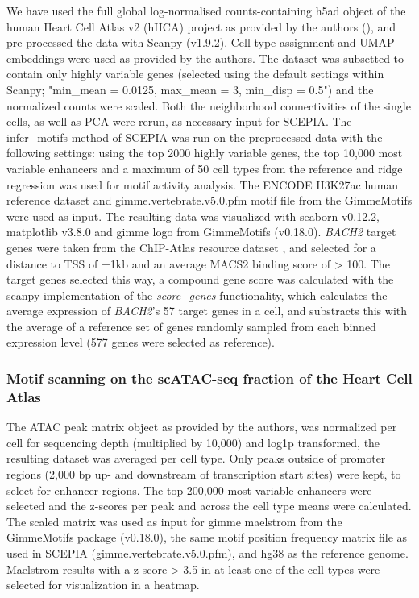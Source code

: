 We have used the full global log-normalised counts-containing h5ad object of the human Heart Cell Atlas v2 (hHCA) project as provided by the authors (\cite{Kanemaru2023}), and pre-processed the data with Scanpy (v1.9.2). Cell type assignment and UMAP-embeddings were used as provided by the authors. The dataset was subsetted to contain only highly variable genes (selected using the default settings within Scanpy; "min\_mean = 0.0125, max\_mean = 3, min\_disp = 0.5") and the normalized counts were scaled. Both the neighborhood connectivities of the single cells, as well as PCA were rerun, as necessary input for SCEPIA. The infer\_motifs method of SCEPIA was run on the preprocessed data with the following settings: using the top 2000 highly variable genes, the top 10,000 most variable enhancers and a maximum of 50 cell types from the reference and ridge regression was used for motif activity analysis. The ENCODE H3K27ac human reference dataset and gimme.vertebrate.v5.0.pfm motif file from the GimmeMotifs were used as input. The resulting data was visualized with seaborn v0.12.2, matplotlib v3.8.0 and gimme logo from GimmeMotifs (v0.18.0). \textit{BACH2} target genes were taken from the ChIP-Atlas resource dataset \cite{Oki2018,Zou2022,BACH2_target_genes}, and selected for a distance to TSS of ±1kb and an average MACS2 binding score of > 100. The target genes selected this way, a compound gene score was calculated with the scanpy implementation of the \textit{score\_genes} functionality, which calculates the average expression of \textit{BACH2}'s 57 target genes in a cell, and substracts this with the average of a reference set of genes randomly sampled from each binned expression level (577 genes were selected as reference).

\subsubsection{Motif scanning on the scATAC-seq fraction of the Heart Cell Atlas}

The ATAC peak matrix object as provided by the authors, was normalized per cell for sequencing depth (multiplied by 10,000) and log1p transformed, the resulting dataset was averaged per cell type. Only peaks outside of promoter regions (2,000 bp up- and downstream of transcription start sites) were kept, to select for enhancer regions. The top 200,000 most variable enhancers were selected and the z-scores per peak and across the cell type means were calculated. The scaled matrix was used as input for gimme maelstrom from the GimmeMotifs package (v0.18.0), the same motif position frequency matrix file as used in SCEPIA (gimme.vertebrate.v5.0.pfm), and hg38 as the reference genome. Maelstrom results with a z-score > 3.5 in at least one of the cell types were selected for visualization in a heatmap.

